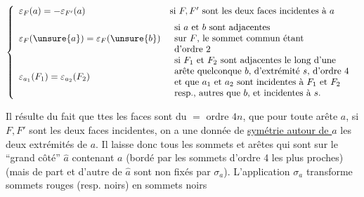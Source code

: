 \[
\left\{\begin{array}{ll}
\varepsilon_F(a)=-\varepsilon_{F'}(a)&\text{si \(F,F'\) sont les deux faces incidentes à \(a\)}\\[6pt]
\varepsilon_F(\unsure{a})=\varepsilon_F(\unsure{b})&\begin{array}{l}\text{si \(a\) et \(b\) sont adjacentes}\\\text{sur \(F\), le sommet commun étant}\\\text{d'ordre 2}\end{array}\\[6pt]
\varepsilon_{a_1}(F_1)=\varepsilon_{a_2}(F_2)&\begin{array}{l}\text{si \(F_1\) et \(F_2\) sont adjacentes le long d'une}\\\text{arête quelconque \(b\), d'extrémité \(s\), d'ordre 4}\\\text{et que \(a_1\) et \(a_2\) sont incidentes à \(F_1\) et \(F_2\)}\\\text{resp., autres que \(b\), et incidentes à \(s\).}\end{array}
\end{array}\right.
\]

Il résulte du fait que ttes les faces sont du $=$ ordre \(4n\), que pour  toute arête \(a\), si \(F,F'\) sont les deux faces incidentes, on a une donnée de \uline{symétrie autour de \(a\)}
  les deux extrémités de \(a\). Il laisse donc   tous les sommets et arêtes qui sont sur le ``grand côté'' \(\widehat a\) contenant \(a\) (bordé par les sommets d'ordre 4 les plus proches) (mais  de part et d'autre de \(\widehat a\) sont non fixés par \(\sigma_a\)). L'application \(\sigma_a\) transforme sommets rouges (resp. noirs) en sommets noirs
